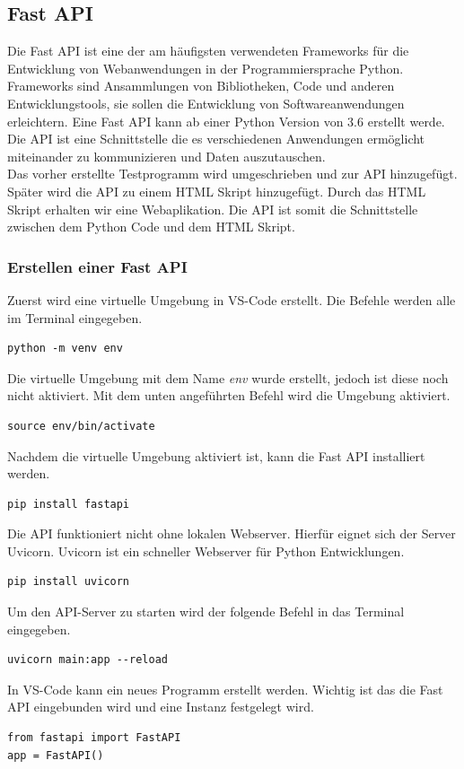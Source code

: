 \subsection{Fast API}\label{sec:API}
Die Fast API\autocite{FastAPI} ist eine der am häufigsten verwendeten Frameworks für die Entwicklung von Webanwendungen in der Programmiersprache Python. Frameworks sind Ansammlungen von Bibliotheken, Code und anderen Entwicklungstools, sie sollen die Entwicklung von Softwareanwendungen erleichtern. Eine Fast API kann ab einer Python Version von 3.6 erstellt werde. Die API ist eine Schnittstelle die es verschiedenen Anwendungen ermöglicht miteinander zu kommunizieren und Daten auszutauschen.\\
\vspace{3mm}
Das vorher erstellte Testprogramm wird umgeschrieben und zur API hinzugefügt. Später wird die API zu einem HTML Skript hinzugefügt. Durch das HTML Skript erhalten wir eine Webaplikation. Die API ist somit die Schnittstelle zwischen dem Python Code und dem HTML Skript.\\
\vspace{3mm}
\subsubsection{Erstellen einer Fast API}
Zuerst wird eine virtuelle Umgebung in VS-Code erstellt. Die Befehle werden alle im Terminal eingegeben.
\begin{verbatim}
python -m venv env
\end{verbatim}
Die virtuelle Umgebung mit dem Name \textit{env} wurde erstellt, jedoch ist diese noch nicht aktiviert. Mit dem unten angeführten Befehl wird die Umgebung aktiviert. 
\begin{verbatim}
source env/bin/activate
\end{verbatim}
Nachdem die virtuelle Umgebung aktiviert ist, kann die Fast API installiert werden. 
\begin{verbatim}
pip install fastapi
\end{verbatim}
Die API funktioniert nicht ohne lokalen Webserver. Hierfür eignet sich der Server Uvicorn. Uvicorn\autocite{uvicorn} ist ein schneller Webserver für Python Entwicklungen.  
\begin{verbatim}
pip install uvicorn
\end{verbatim}
Um den API-Server zu starten wird der folgende Befehl in das Terminal eingegeben.
\begin{verbatim}
uvicorn main:app --reload
\end{verbatim}
In VS-Code kann ein neues Programm erstellt werden. Wichtig ist das die Fast API eingebunden wird und eine Instanz festgelegt wird.
\begin{verbatim}
from fastapi import FastAPI
app = FastAPI()
\end{verbatim}

